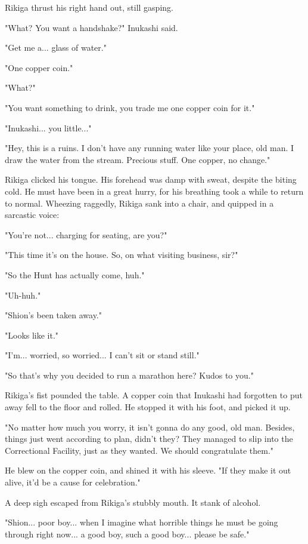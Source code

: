 Rikiga thrust his right hand out, still gasping.

"What? You want a handshake?" Inukashi said.

"Get me a... glass of water."

"One copper coin."

"What?"

"You want something to drink, you trade me one copper coin for it."

"Inukashi... you little..."

"Hey, this is a ruins. I don't have any running water like your place,
old man. I draw the water from the stream. Precious stuff. One copper,
no change."

Rikiga clicked his tongue. His forehead was damp with sweat, despite the
biting cold. He must have been in a great hurry, for his breathing took
a while to return to normal. Wheezing raggedly, Rikiga sank into a
chair, and quipped in a sarcastic voice:

"You're not... charging for seating, are you?"

"This time it's on the house. So, on what visiting business, sir?"

"So the Hunt has actually come, huh."

"Uh-huh."

"Shion's been taken away."

"Looks like it."

"I'm... worried, so worried... I can't sit or stand still."

"So that's why you decided to run a marathon here? Kudos to you."

Rikiga's fist pounded the table. A copper coin that Inukashi had
forgotten to put away fell to the floor and rolled. He stopped it with
his foot, and picked it up.

"No matter how much you worry, it isn't gonna do any good, old man.
Besides, things just went according to plan, didn't they? They managed
to slip into the Correctional Facility, just as they wanted. We should
congratulate them."

He blew on the copper coin, and shined it with his sleeve. "If they make
it out alive, it'd be a cause for celebration."

A deep sigh escaped from Rikiga's stubbly mouth. It stank of alcohol.

"Shion... poor boy... when I imagine what horrible things he must be
going through right now... a good boy, such a good boy... please be
safe."

